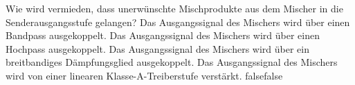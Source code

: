     {Wie wird vermieden, dass unerwünschte Mischprodukte aus dem Mischer in die Senderausgangsstufe gelangen?}
    {Das Ausgangssignal des Mischers wird über einen Bandpass ausgekoppelt.}
    {Das Ausgangssignal des Mischers wird über einen Hochpass ausgekoppelt.}
    {Das Ausgangssignal des Mischers wird über ein breitbandiges Dämpfungsglied ausgekoppelt.}
    {Das Ausgangssignal des Mischers wird von einer linearen Klasse-A-Treiberstufe verstärkt.}
    {false}{false}